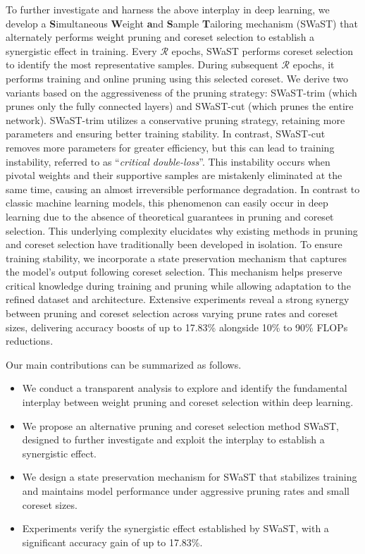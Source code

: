 To further investigate and harness the above interplay in deep learning, we develop a \textbf{S}imultaneous \textbf{W}eight \textbf{a}nd \textbf{S}ample \textbf{T}ailoring mechanism (SWaST) that alternately performs weight pruning and coreset selection to establish a synergistic effect in training.
Every \(\mathcal{R}\) epochs, SWaST performs coreset selection to identify the most representative samples. During subsequent \(\mathcal{R}\) epochs, it performs training and online pruning using this selected coreset.
We derive two variants based on the aggressiveness of the pruning strategy: SWaST-trim (which prunes only the fully connected layers) and SWaST-cut (which prunes the entire network). SWaST-trim utilizes a conservative pruning strategy, retaining more parameters and ensuring better training stability. In contrast, SWaST-cut removes more parameters for greater efficiency, but this can lead to training instability, referred to as “{\it critical double-loss}”. This instability occurs when pivotal weights and their supportive samples are mistakenly eliminated at the same time, causing an almost irreversible performance degradation. 
In contrast to classic machine learning models, this phenomenon can easily occur in deep learning due to the absence of theoretical guarantees in pruning and coreset selection. This underlying complexity elucidates why existing methods in pruning and coreset selection have traditionally been developed in isolation.
To ensure training stability, we incorporate a state preservation mechanism that captures the model's output following coreset selection. This mechanism helps preserve critical knowledge during training and pruning while allowing adaptation to the refined dataset and architecture. Extensive experiments reveal a strong synergy between pruning and coreset selection across varying prune rates and coreset sizes, delivering accuracy boosts of up to 17.83\% alongside 10\% to 90\% FLOPs reductions.

Our main contributions can be summarized as follows.
\begin{itemize}
\item We conduct a transparent analysis to explore and identify the fundamental interplay between weight pruning and coreset selection within deep learning.
\item We propose an alternative pruning and coreset selection method SWaST, designed to further investigate and  exploit the interplay to establish a synergistic effect.
\item We design a state preservation mechanism for SWaST that stabilizes training and maintains model performance under aggressive pruning rates and small coreset sizes.
\item Experiments verify the synergistic effect established by SWaST, with a significant accuracy gain of up to 17.83\%.
\end{itemize}